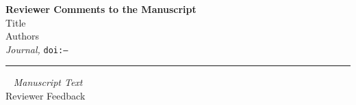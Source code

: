 \providecommand{\lettertitle}{Reviewer Comments to the Manuscript}
\providecommand{\papertitle}{Title}
\providecommand{\authors}{Authors}
\providecommand{\journal}{Journal}
\providecommand{\doi}{--}





{\Large\bf \lettertitle}\\[1em]
{\huge \papertitle}\\[1em]
{\authors}\\
{\it \journal, }\texttt{doi:\doi}\\
\hrule

\begin{flushright}
\vspace{-1em}
\vline ~ \emph{Manuscript Text} \\
Reviewer Feedback \\
\end{flushright}
